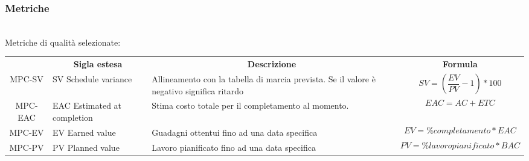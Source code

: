 \subsubsection{Metriche}\mbox{}\\
Metriche di qualità selezionate:
\begin{table}[H]
    \centering
    \renewcommand{\arraystretch}{1.4}
    \begin{tabular}{| c | p{3cm} | p{4cm} |p{2cm} | }
        \rowcolor[HTML]{a52a2a}
        \multicolumn{1}{c}{\color[HTML]{FFFFFF} \textbf{Codice}}       &
        \multicolumn{1}{c}{\color[HTML]{FFFFFF} \textbf{Sigla estesa}} &
        \multicolumn{1}{c}{\color[HTML]{FFFFFF} \textbf{Descrizione}}  &
        \multicolumn{1}{c}{\color[HTML]{FFFFFF} \textbf{Formula}}                                                                                                                                                                                                                              \\
        MPC-SV                                                         & SV Schedule variance            & Allineamento con la tabella di marcia prevista. Se il valore è negativo significa ritardo & \begin{equation}SV =(\frac{EV}{PV}-1) * 100\end{equation}                               \\
        MPC-EAC                                                        & EAC Estimated at completion     & Stima costo totale per il completamento al momento.                                       & \begin{equation}EAC = AC + ETC                 \end{equation}                           \\
        MPC-EV                                                         & EV Earned value                 & Guadagni ottentui fino ad una data specifica                                              & \begin{equation}EV = \% completamento * EAC    \end{equation}                           \\
        MPC-PV                                                         & PV Planned value                & Lavoro pianificato fino ad una data specifica                                             & \begin{equation}PV=\% lavoro pianificato *BAC   \end{equation}                          \\

\end{tabular}
\end{table}
